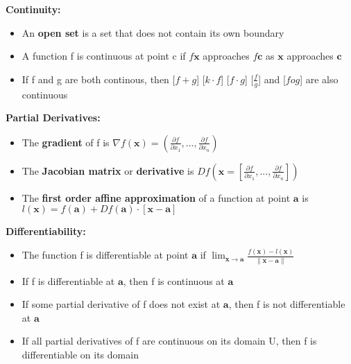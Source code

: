 \documentclass[12pt, letterpaper]{article}
\begin{document}
\textbf{Continuity:}
\begin{itemize}
    \item An \textbf{open set} is a set that does not contain its own boundary
    \item A function f is continuous at point c if $f\mathbf{x}$ approaches $f\mathbf{c}$ as $\mathbf{x}$ approaches $\mathbf{c}$
    \item If f and g are both continous, then [$f + g$] [$k \cdot f$] [$f \cdot g$] [$\frac{f}{g}$] and [$f o g$] are also continuous \\
\end{itemize}

\textbf{Partial Derivatives:}
\begin{itemize}
    \item The \textbf{gradient} of f is $\nabla f(\mathbf{x}) = (\frac{\partial f}{\partial x_1},...,\frac{\partial f}{\partial x_n})$
    \item The \textbf{Jacobian matrix} or \textbf{derivative} is $Df(\mathbf{x} = [\frac{\partial f}{\partial x_1},...,\frac{\partial f}{\partial x_n}])$
    \item The \textbf{first order affine approximation} of a function at point $\mathbf{a}$ is $l(\mathbf{x}) = f(\mathbf{a}) + Df(\mathbf{a}) \cdot [\mathbf{x} - \mathbf{a}]$ \\
\end{itemize}

\textbf{Differentiability:}
\begin{itemize}
    \item The function f is differentiable at point $\mathbf{a}$ if $\lim_{{\mathbf{x} \to \mathbf{a}}} \frac{f(\mathbf{x}) - l(\mathbf{x})}{\|\mathbf{x} - \mathbf{a}\|}$
    \item If f is differentiable at $\mathbf{a}$, then f is continuous at $\mathbf{a}$
    \item If some partial derivative of f does not exist at $\mathbf{a}$, then f is not differentiable at $\mathbf{a}$
    \item If all partial derivatives of f are continuous on its domain U, then f is differentiable on its domain
\end{itemize}
\end{document}
